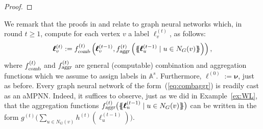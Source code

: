 \begin{proof}
%
%
\end{proof}

We remark that the proofs in \cite{xhlj19} and \cite{grohewl} relate to  graph neural networks which, in round $t\geq 1$, compute for each vertex $v$ a label $\pmb{\ell}^{(t)}_{v}$, as follows:
\begin{equation}
\pmb{\ell}^{(t)}_{v}:=
f_{\textsl{comb}}^{(t)}\left(
\pmb{\ell}_{v}^{(t-1)},f_{\textsl{aggr}}^{(t)}\left(\{\!\!\{ \pmb{\ell}^{(t-1)}_{u} \mid u \in N_G(v) \}\!\!\}\right)
\right), \label{eq:combaggr}
\end{equation}
where $f_{\textsl{comb}}^{(t)}$ and  $f_{\textsl{aggr}}^{(t)}$ are general (computable) combination and aggregation functions which we assume to assign labels in $\mathbb{A}^s$. Furthermore, $\pmb{\ell}^{(0)}:=\pmb{\nu}$, just as before. Every graph neural network of the form~(\ref{eq:combaggr}) is readily cast as an aMPNN. Indeed,
it suffices to observe, just as we did in Example~\ref{ex:WL}, that the aggregation functions $f_{\textsl{aggr}}^{(t)}\bigl(\{\!\!\{ \pmb{\ell}^{(t-1)}_{u} \mid u \in N_G(v) \}\!\!\}\bigr)$ can be written in the form $g^{(t)}\bigl(\sum_{u\in N_G(v)} h^{(t)}(\pmb{\ell}^{(t-1)}_{u})\bigr)$. 

